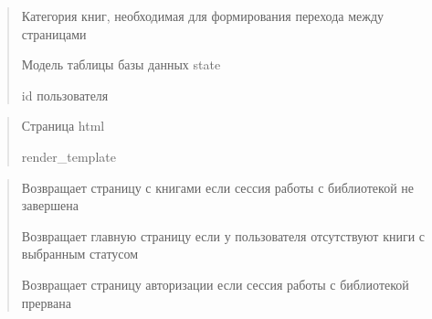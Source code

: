 \documentclass[letterpaper,10pt,russian]{sphinxmanual}
\begin{document}
\begin{fulllineitems}
\begin{description}
\begin{quote}
\begin{description}
\sphinxAtStartPar
Категория книг, необходимая для формирования перехода между страницами

\sphinxAtStartPar
Модель таблицы базы данных state

\sphinxAtStartPar
id пользователя

\end{description}\end{quote}

\end{description}
\begin{quote}\begin{description}
\sphinxAtStartPar
Страница html

\sphinxAtStartPar
render\_template

\end{description}\end{quote}
\begin{description}
\begin{quote}\begin{description}
\sphinxAtStartPar
Возвращает страницу с книгами если сессия работы с библиотекой  не завершена

\sphinxAtStartPar
Возвращает главную страницу если у пользователя отсутствуют книги с выбранным статусом

\sphinxAtStartPar
Возвращает страницу авторизации если сессия работы с библиотекой прервана

\end{description}\end{quote}

\end{description}

\end{fulllineitems}

\end{document}
